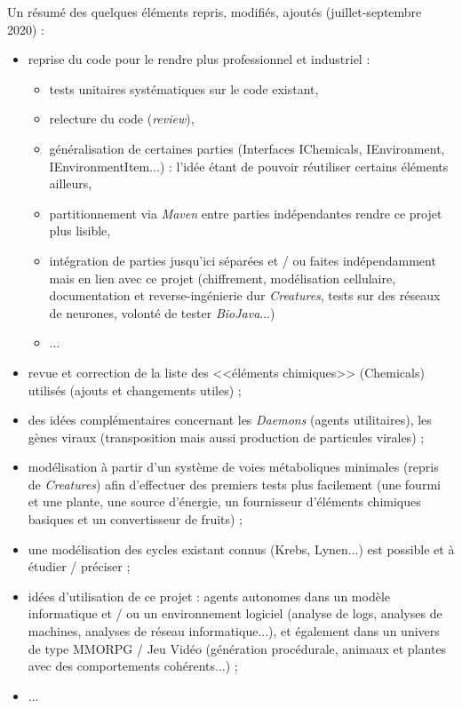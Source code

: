 \documentclass[11pt,twoside,a4paper]{article}
\begin{document}
Un r{\'e}sum{\'e} des quelques {\'e}l{\'e}ments repris, modifi{\'e}s, ajout{\'e}s (juillet-septembre 2020) : 
\begin{itemize}
	\item reprise du code pour le rendre plus professionnel et industriel : 
	\begin{itemize}
		\item tests unitaires syst{\'e}matiques sur le code existant, 
		\item relecture du code (\emph{review}), 
		\item g{\'e}n{\'e}ralisation de certaines parties (Interfaces IChemicals, IEnvironment, IEnvironmentItem...) : l'id{\'e}e {\'e}tant de pouvoir r{\'e}utiliser certains {\'e}l{\'e}ments ailleurs, 
		\item partitionnement via \emph{Maven} entre parties ind{\'e}pendantes rendre ce projet plus lisible, 
		\item int{\'e}gration de parties jusqu'ici s{\'e}par{\'e}es et / ou faites ind{\'e}pendamment mais en lien avec ce projet (chiffrement, mod{\'e}lisation cellulaire, documentation et reverse-ing{\'e}nierie dur \emph{Creatures}, tests sur des r{\'e}seaux de neurones, volont{\'e} de tester \emph{BioJava}...)
		\item ...
	\end{itemize} 
	\item revue et correction de la liste des <<{\'e}l{\'e}ments chimiques>> (Chemicals) utilis{\'e}s (ajouts et changements utiles) ; 
	\item des id{\'e}es compl{\'e}mentaires concernant les \emph{Daemons} (agents utilitaires), les g{\`e}nes viraux (transposition mais aussi production de particules virales) ; 
	\item mod{\'e}lisation {\`a} partir d'un syst{\`e}me de voies m{\'e}taboliques minimales (repris de \emph{Creatures}) afin d'effectuer des premiers tests plus facilement (une fourmi et une plante, une source d'{\'e}nergie, un fournisseur d'{\'e}l{\'e}ments chimiques basiques et un convertisseur de fruits) ;
	\item une mod{\'e}lisation des cycles existant connus (Krebs, Lynen...) est possible et {\`a} {\'e}tudier / pr{\'e}ciser ; 
	\item id{\'e}es d'utilisation de ce projet : agents autonomes dans un mod{\`e}le informatique et / ou un environnement logiciel (analyse de logs, analyses de machines, analyses de r{\'e}seau informatique...), et {\'e}galement dans un univers de type MMORPG / Jeu Vid{\'e}o (g{\'e}n{\'e}ration proc{\'e}durale, animaux et plantes avec des comportements coh{\'e}rents...) ; 
	\item ... 
\end{itemize}
\end{document}
